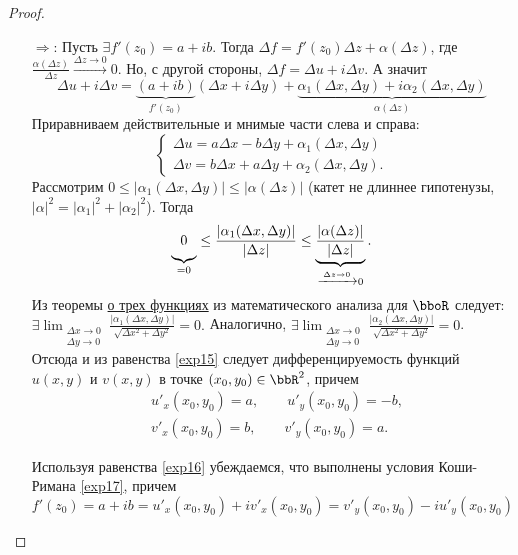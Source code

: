 \begin{proof}\leavevmode
\begin{itemize}[wide, labelwidth=!, labelindent=\parindent]
\item[$\Longrightarrow$:]
Пусть $\exists f'(z_0) = a+ib $. Тогда $\Delta f = f'(z_0)\Delta z + \alpha(\Delta z)$, где $\frac{\alpha(\Delta z)}{\Delta z}\xrightarrow{\Delta z \to 0}0$. Но, с другой стороны, $\Delta f = \Delta u + i \Delta v$. А значит
$$
\Delta u + i \Delta v = \underbrace{(a+ib)}_{f'(z_0)}(\Delta x + i \Delta y) + \underbrace{\alpha_1(\Delta x, \Delta y) +i \alpha_2(\Delta x, \Delta y)}_{\alpha(\Delta z)}
$$
Приравниваем действительные и мнимые части слева и справа:
\begin{equation}
\label{exp15}
\begin{cases}
\Delta u = a\Delta x - b \Delta y + \alpha_1(\Delta x, \Delta y) \\
\Delta v = b\Delta x + a \Delta y + \alpha_2(\Delta x, \Delta y).
\end{cases}
\end{equation}
Рассмотрим $0 \le |\alpha_1(\Delta x, \Delta y)| \le |\alpha(\Delta z)|$ (катет не длиннее гипотенузы, $|\alpha|^2=|\alpha_1|^2 + |\alpha_2|^2 $). Тогда
$$
\underbrace{{{\vphantom{\frac{0}{0}}}}0}_{=0} \le \frac{|\alpha_1(\Delta x, \Delta y)|}{|\Delta z|} \le \underbrace{\frac{|\alpha(\Delta z)|}{|\Delta z|}}_{\xrightarrow{\Delta z \to 0} 0 }.
$$
Из теоремы \hyperref[th:ch1:threefuncs]{о трех функциях} из математического анализа для $\bboR$ следует: $\exists \lim_{\substack{\Delta x \to 0\\ \Delta y \to 0}}\limits \frac{|\alpha_1(\Delta x,\Delta y)|}{\sqrt{\Delta x ^2 + \Delta y^2}} = 0.$
Аналогично, $\exists \lim_{\substack{\Delta x \to 0\\ \Delta y \to 0}}\limits \frac{|\alpha_2(\Delta x,\Delta y)|}{\sqrt{\Delta x^2 + \Delta y^2}} = 0$. 
Отсюда и из равенства \eqref{exp15} следует дифференцируемость функций $u(x,y)$ и $v(x,y)$ в точке $(x_0,y_0) \in \bbR^2$, причем 
\begin{equation}
\label{exp16}
\begin{split}
&u'_x(x_0,y_0) = a, \qquad u'_y(x_0,y_0) = -b,\\
&v'_x(x_0,y_0) = b, \qquad v'_y(x_0,y_0) = a.
\end{split}
\end{equation}

Используя равенства \eqref{exp16} убеждаемся, что выполнены условия Коши-Римана \eqref{exp17}, причем 
$$
f'(z_0) = a+ib = u'_x(x_0,y_0) + iv'_x(x_0,y_0)= v'_y(x_0,y_0) -iu'_y(x_0,y_0)
$$ 


\end{itemize}
\end{proof}
